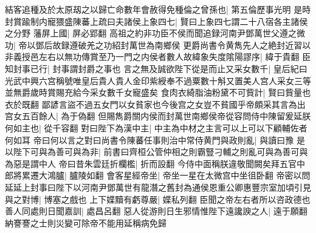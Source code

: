 結客追種及於太原刼之以歸亡命數年會赦得免種倫之曾孫也|{
	第五倫歷事光明}
是時封賞踰制内寵猥盛陳蕃上疏曰夫諸侯上象四七|{
	賢曰上象四七謂二十八宿各主諸侯之分野}
藩屏上國|{
	屏必郢翻}
高祖之約非功臣不侯而聞追録河南尹鄧萬世父遵之微功|{
	帝以鄧后故録遵破羌之功紹封萬世為南鄉侯}
更爵尚書令黄雋先人之絶封近習以非義授邑左右以無功傳賞至乃一門之内侯者數人故緯象失度隂陽謬序|{
	緯于貴翻}
臣知封事已行|{
	封事謂封爵之事也}
言之無及誠欲陛下從是而止又采女數千|{
	皇后紀曰光武中興六宫稱號唯皇后貴人貴人金印紫綬奉不過粟數十斛又置美人宫人采女三等並無爵歲時賞賜充給今采女數千女寵盛矣}
食肉衣綺脂油粉黛不可貲計|{
	賢曰貲量也衣於既翻}
鄙諺言盜不過五女門以女貧家也今後宫之女豈不貧國乎帝頗采其言為出宫女五百餘人|{
	為于偽翻}
但賜雋爵關内侯而封萬世南鄉侯帝從容問侍中陳留爰延朕何如主也|{
	從千容翻}
對曰陛下為漢中主|{
	中主為中材之主言可以上可以下顧輔佐者何如耳}
帝曰何以言之對曰尚書令陳蕃任事則治中常侍黄門與政則亂|{
	與讀曰豫}
是以陛下可與為善可與為非|{
	前書曰齊桓公管仲相之則霸豎刁輔之則亂可與為善可與為惡是謂中人}
帝曰昔朱雲廷折欄檻|{
	折而設翻}
今侍中面稱朕違敬聞闕矣拜五官中郎將累遷大鴻臚|{
	臚陵如翻}
會客星經帝坐|{
	帝坐一星在太微宫中坐徂卧翻}
帝密以問延延上封事曰陛下以河南尹鄧萬世有龍潛之舊封為通侯恩重公卿惠豐宗室加頃引見與之對博|{
	博塞之戲也}
上下媟黷有虧尊嚴|{
	媟私列翻}
臣聞之帝左右者所以咨政德也善人同處則日聞嘉訓|{
	處昌呂翻}
惡人從游則日生邪情惟陛下遠讒諛之人|{
	遠于願翻}
納謇謇之士則災變可除帝不能用延稱病免歸

